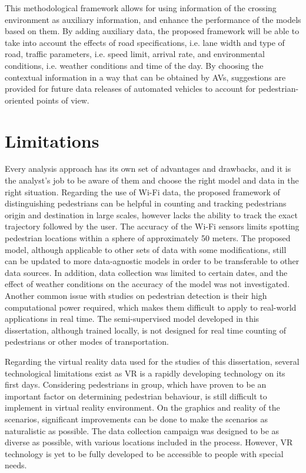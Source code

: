 This methodological framework allows for using information of the crossing environment as auxiliary information, and enhance the performance of the models based on them. By adding auxiliary data, the proposed framework will be able to take into account the effects of road specifications, i.e. lane width and type of road, traffic parameters, i.e. speed limit, arrival rate, and environmental conditions, i.e. weather conditions and time of the day. By choosing the contextual information in a way that can be obtained by AVs, suggestions are provided for future data releases of automated vehicles to account for pedestrian-oriented points of view.

\section{Limitations}
\label{chap7:sec2}
Every analysis approach has its own set of advantages and drawbacks, and it is the analyst's job to be aware of them and choose the right model and data in the right situation. Regarding the use of Wi-Fi data, the proposed framework of distinguishing pedestrians can be helpful in counting and tracking pedestrians origin and destination in large scales, however lacks the ability to track the exact trajectory followed by the user. The accuracy of the Wi-Fi sensors limits spotting pedestrian locations within a sphere of approximately 50 meters. The proposed model, although applicable to other sets of data with some modifications, still can be updated to more data-agnostic models in order to be transferable to other data sources. In addition, data collection was limited to certain dates, and the effect of weather conditions on the accuracy of the model was not investigated. Another common issue with studies on pedestrian detection is their high computational power required, which makes them difficult to apply to real-world applications in real time. The semi-supervised model developed in this dissertation, although trained locally, is not designed for real time counting of pedestrians or other modes of transportation.

Regarding the virtual reality data used for the studies of this dissertation, several technological limitations exist as VR is a rapidly developing technology on its first days. Considering pedestrians in group, which have proven to be an important factor on determining pedestrian behaviour, is still difficult to implement in virtual reality environment. On the graphics and reality of the scenarios, significant improvements can be done to make the scenarios as naturalistic as possible. The data collection campaign was designed to be as diverse as possible, with various locations included in the process. However, VR technology is yet to be fully developed to be accessible to people with special needs.   

